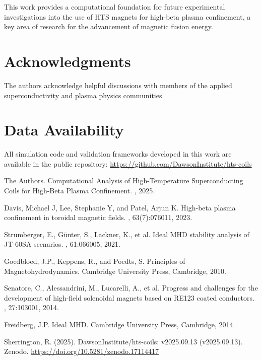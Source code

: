 \documentclass[12pt,a4paper]{article}
\begin{document}
This work provides a computational foundation for future experimental investigations into the use of HTS magnets for high-beta plasma confinement, a key area of research for the advancement of magnetic fusion energy.

\section*{Acknowledgments}

The authors acknowledge helpful discussions with members of the applied superconductivity and plasma physics communities.



\section*{Data Availability}

All simulation code and validation frameworks developed in this work are available in the public repository: \url{https://github.com/DawsonInstitute/hts-coils}

\begin{thebibliography}{99}

The Authors.
\newblock Computational Analysis of High-Temperature Superconducting Coils for High-Beta Plasma Confinement.
, 2025.

Davis, Michael J, Lee, Stephanie Y, and Patel, Arjun K.
\newblock High-beta plasma confinement in toroidal magnetic fields.
, 63(7):076011, 2023.

Strumberger, E., Günter, S., Lackner, K., et al.
\newblock Ideal MHD stability analysis of JT-60SA scenarios.
, 61:066005, 2021.

Goedbloed, J.P., Keppens, R., and Poedts, S.
\newblock Principles of Magnetohydrodynamics.
\newblock Cambridge University Press, Cambridge, 2010.

Senatore, C., Alessandrini, M., Lucarelli, A., et al.
\newblock Progress and challenges for the development of high-field solenoidal magnets based on RE123 coated conductors.
, 27:103001, 2014.

Freidberg, J.P.
\newblock Ideal MHD.
\newblock Cambridge University Press, Cambridge, 2014.

Sherrington, R. (2025). 
\newblock DawsonInstitute/hts-coils: v2025.09.13 (v2025.09.13). 
\newblock Zenodo. \url{https://doi.org/10.5281/zenodo.17114417}


\end{thebibliography}
\end{document}
